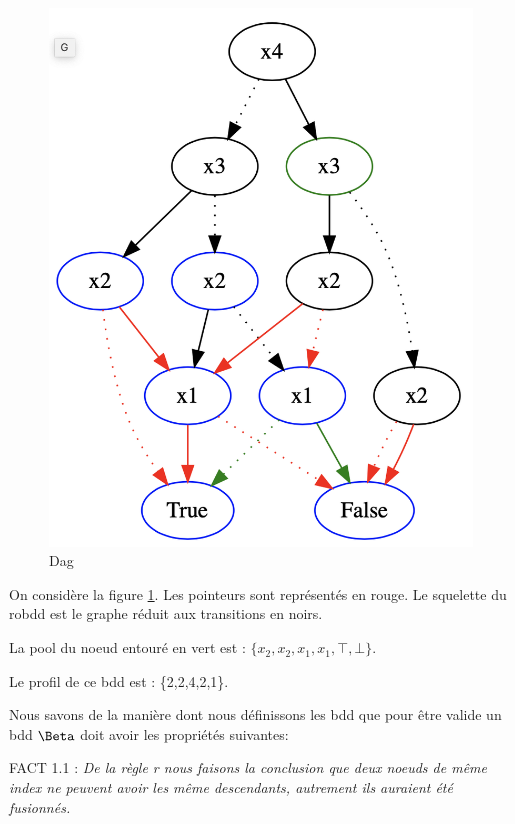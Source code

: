 \documentclass[french]{article}
\begin{document}
\begin{figure}[htp]
    \centering
    \includegraphics[scale=0.35]{tree21_new.png}
    \caption{Dag}
    \label{fig:tree21_new}
\end{figure}
On considère la figure \ref{fig:tree21_new}. Les pointeurs sont représentés en rouge. Le squelette du robdd est le graphe réduit aux transitions en noirs.

La pool du noeud entouré en vert est : \(\{x_2,x_2,x_1,x_1,\top,\bot\}\). 

Le profil de ce bdd est : \{2,2,4,2,1\}.

\vspace{5mm} 

Nous savons de la manière dont nous définissons les bdd que pour être valide un bdd \(\Beta\) doit avoir les propriétés suivantes:

FACT 1.1 : \emph{De la règle r nous faisons la conclusion que deux noeuds de même index ne peuvent avoir les même descendants, autrement ils auraient été fusionnés.}
\end{document}
